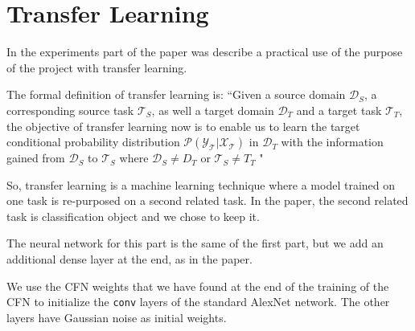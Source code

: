 \section{Transfer Learning}

In the experiments part of the paper was describe a practical use of the purpose of the project with transfer learning. 

The formal definition of transfer learning is: \textquotedblleft Given a source domain $\mathcal{D}_{S}$, a corresponding source task $\mathcal{T}_{S}$, as well a target domain $\mathcal{D}_{T}$ and a target task $\mathcal{T}_{T}$, the objective of transfer learning now is to enable us to learn the target conditional probability distribution $\mathcal{P(Y_{T}|X_{T})}$ in $\mathcal{D}_{T}$ with the information gained from $\mathcal{D}_{S}$ to $\mathcal{T}_{S}$ where $\mathcal{D}_{S} \neq {D}_{T}$ or $\mathcal{T}_{S} \neq {T}_{T}$ "

So, transfer learning is a machine learning technique where a model trained on one task is re-purposed on a second related task. In the paper, the second related task is classification object and we chose to keep it.

The neural network for this part is the same of the first part, but we add an additional dense layer at the end, as in the paper.

We use the CFN weights that we have found at the end of the training of the CFN to initialize the \texttt{conv} layers of the standard AlexNet network. The other layers have Gaussian noise as initial weights.


